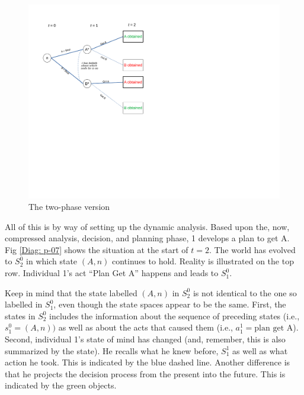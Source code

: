 \documentclass[
11pt,
titlepage,
reqno,
]{article}%
\theoremstyle{definition}
\begin{document}
\begin{figure}[h!]
	\centering
	\includegraphics*[page=5,trim = 0 2in 0in 0in,scale=.65]{Awareness_Diagrams_All}
	\caption{The two-phase version\label{Diag: p-05}}%
\end{figure}

All of this is by way of setting up the dynamic analysis. Based upon the, now, compressed analysis, decision, and planning phase, 1 develops a plan to get A. Fig \ref{Diag: p-07} shows the situation at the start of $t=2$. The world has evolved to $S^0_2$ in which state $(A,n)$ continues to hold. Reality is illustrated on the top row. Individual 1's act ``Plan Get A'' happens and leads to $S^0_1$. 

Keep in mind that the state labelled $(A,n)$ in $S^0_2$ is not identical to the one so labelled in $S^0_1$, even though the state spaces appear to be the same. First, the states in $S^0_2$ includes the information about the sequence of preceding states (i.e., $s^0_1=(A,n))$ as well as about the acts that caused them (i.e., $a^1_1 = \text{plan get A}$). Second,  individual 1's state of mind has changed (and, remember, this is also summarized by the state). He recalls what he knew before, $S^1_1$ as well as what action he took. This  is indicated by the blue dashed line. Another difference is that he projects the decision process from the present into the future. This is indicated by the green objects. 
\end{document}
